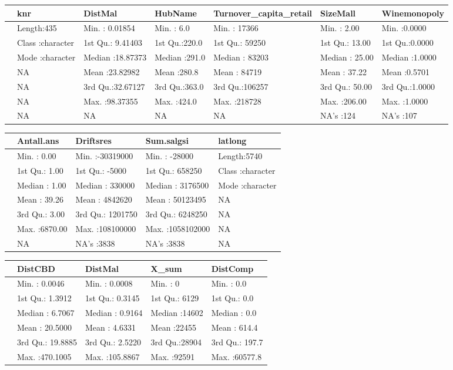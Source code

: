 \documentclass[
  10,
  a4paper,
]{article}
\begin{document}
\begin{tabular}{l|l|l|l|l|l|l}
\hline
  &     knr &    DistMal &    HubName & Turnover\_capita\_retail &    SizeMall &  Winemonopoly\\
\hline
 & Length:435 & Min.   : 0.01854 & Min.   :  6.0 & Min.   : 17366 & Min.   :  2.00 & Min.   :0.0000\\
\hline
 & Class :character & 1st Qu.: 9.41403 & 1st Qu.:220.0 & 1st Qu.: 59250 & 1st Qu.: 13.00 & 1st Qu.:0.0000\\
\hline
 & Mode  :character & Median :18.87373 & Median :291.0 & Median : 83203 & Median : 25.00 & Median :1.0000\\
\hline
 & NA & Mean   :23.82982 & Mean   :280.8 & Mean   : 84719 & Mean   : 37.22 & Mean   :0.5701\\
\hline
 & NA & 3rd Qu.:32.67127 & 3rd Qu.:363.0 & 3rd Qu.:106257 & 3rd Qu.: 50.00 & 3rd Qu.:1.0000\\
\hline
 & NA & Max.   :98.37355 & Max.   :424.0 & Max.   :218728 & Max.   :206.00 & Max.   :1.0000\\
\hline
 & NA & NA & NA & NA & NA's   :124 & NA's   :107\\
\hline
\end{tabular}

\begin{tabular}{l|l|l|l|l}
\hline
  &   Antall.ans &   Driftsres &   Sum.salgsi &   latlong\\
\hline
 & Min.   :   0.00 & Min.   :-30319000 & Min.   :    -28000 & Length:5740\\
\hline
 & 1st Qu.:   1.00 & 1st Qu.:    -5000 & 1st Qu.:    658250 & Class :character\\
\hline
 & Median :   1.00 & Median :   330000 & Median :   3176500 & Mode  :character\\
\hline
 & Mean   :  39.26 & Mean   :  4842620 & Mean   :  50123495 & NA\\
\hline
 & 3rd Qu.:   3.00 & 3rd Qu.:  1201750 & 3rd Qu.:   6248250 & NA\\
\hline
 & Max.   :6870.00 & Max.   :108100000 & Max.   :1058102000 & NA\\
\hline
 & NA & NA's   :3838 & NA's   :3838 & NA\\
\hline
\end{tabular}

\begin{tabular}{l|l|l|l|l}
\hline
  &    DistCBD &    DistMal &     X\_sum &    DistComp\\
\hline
 & Min.   :  0.0046 & Min.   :  0.0008 & Min.   :    0 & Min.   :    0.0\\
\hline
 & 1st Qu.:  1.3912 & 1st Qu.:  0.3145 & 1st Qu.: 6129 & 1st Qu.:    0.0\\
\hline
 & Median :  6.7067 & Median :  0.9164 & Median :14602 & Median :    0.0\\
\hline
 & Mean   : 20.5000 & Mean   :  4.6331 & Mean   :22455 & Mean   :  614.4\\
\hline
 & 3rd Qu.: 19.8885 & 3rd Qu.:  2.5220 & 3rd Qu.:28904 & 3rd Qu.:  197.7\\
\hline
 & Max.   :470.1005 & Max.   :105.8867 & Max.   :92591 & Max.   :60577.8\\
\hline
\end{tabular}
\end{document}
